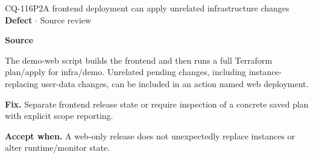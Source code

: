 \begin{finding}{CQ-116}{P2}{A frontend deployment can apply unrelated infrastructure changes}
\textbf{Defect} $\cdot$ Source review\par
\textbf{Source}\quad{}\par
The demo-web script builds the frontend and then runs a full Terraform plan/apply for infra/demo. Unrelated pending changes, including instance-replacing user-data changes, can be included in an action named web deployment.\par
\textbf{Fix.} Separate frontend release state or require inspection of a concrete saved plan with explicit scope reporting.\par
\textbf{Accept when.} A web-only release does not unexpectedly replace instances or alter runtime/monitor state.
\end{finding}
\clearpage
